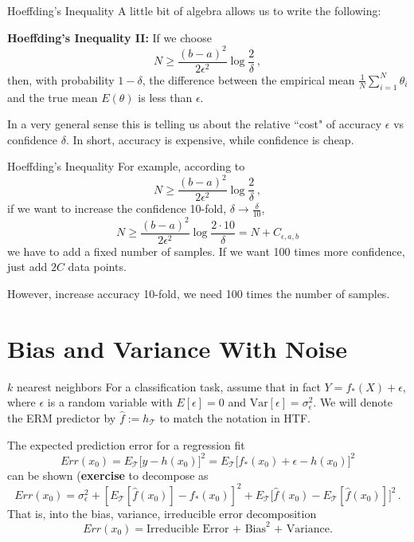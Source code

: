 \documentclass[10pt, table, dvipsnames,handout]{beamer}
\newcommand{\cT}{\ensuremath{\mathcal{T}}}
\begin{document}
\begin{frame}[fragile]{Hoeffding's Inequality}
A little bit of algebra allows us to write the following:\newline

\textbf{Hoeffding's Inequality II:} If we choose 
$$
N \geq \frac{(b-a)^2}{2\epsilon^2}\log \frac{2}{\delta}\,,
$$
then, with probability $1-\delta$, the difference between the empirical mean $\frac{1}{N}\sum_{i=1}^N \theta_i$ and the true mean $E(\theta)$ is less than $\epsilon$. \pause

In a very general sense this is telling us about the relative ``cost" of accuracy $\epsilon$ vs confidence $\delta$. In short, accuracy is expensive, while confidence is cheap.
\end{frame}





\begin{frame}[fragile]{Hoeffding's Inequality}
For example, according to
$$
N \geq \frac{(b-a)^2}{2\epsilon^2}\log \frac{2}{\delta}\,,
$$
if we want to increase the confidence 10-fold, $\delta\to\frac{\delta}{10}$,
$$
N \geq \frac{(b-a)^2}{2\epsilon^2}\log \frac{2\cdot 10}{\delta} = N+C_{\epsilon, a,b}
$$
we have to add a fixed number of samples. If we want 100 times more confidence, just add $2C$ data points. \pause \newline

However, increase accuracy 10-fold, we need 100 times the number of samples. 
\end{frame}










\section{Bias and Variance With Noise}

\begin{frame}[fragile]{$k$ nearest neighbors}
For a classification task, assume that in fact $Y= f_*(X) + \epsilon$, where $\epsilon$ is a random variable with $E[\epsilon] = 0$ and $\text{Var}[\epsilon] = \sigma_\epsilon^2$. We will denote the ERM predictor by $\hat f := h_\cT$ to match the notation in HTF.\pause

The expected prediction error for a regression fit
$$
Err(x_0) = E_\cT\big[ y - h(x_0)\big]^2 = E_\cT\big[ f_*(x_0) + \epsilon - h(x_0)\big]^2
$$\pause
can be shown (\textbf{exercise} to decompose as
$$
Err(x_0) = \sigma_\epsilon^2 + [E_\cT[\hat f(x_0)] - f_*(x_0)]^2 + E_\cT\big[ \hat{f}(x_0) - E_\cT[\hat{f}(x_0)] \big]^2\,.
$$\pause
That is, into the bias, variance, irreducible error decomposition
$$
Err(x_0) = \text{Irreducible Error + Bias}^2\text{ + Variance.}
$$

\end{frame}
\end{document}
